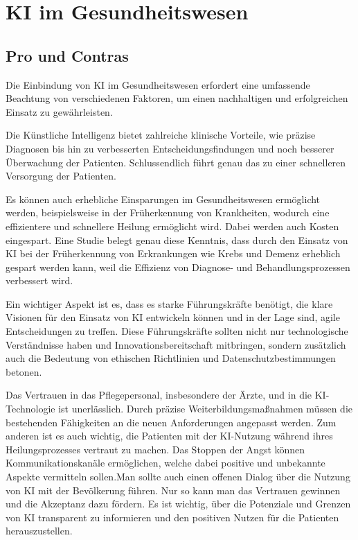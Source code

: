 
\chapter{KI im Gesundheitswesen}

\section {Pro und Contras}
Die Einbindung von KI im Gesundheitswesen erfordert eine umfassende Beachtung von verschiedenen Faktoren, um einen nachhaltigen und erfolgreichen Einsatz zu gewährleisten.

\vspace{1mm}Die Künstliche Intelligenz bietet zahlreiche klinische Vorteile, wie präzise Diagnosen bis hin zu verbesserten Entscheidungsfindungen und noch besserer Überwachung der Patienten. Schlussendlich führt genau das zu einer schnelleren Versorgung der Patienten.

\vspace{1mm}Es können auch erhebliche Einsparungen im Gesundheitswesen ermöglicht werden, beispielsweise in der Früherkennung von Krankheiten, wodurch eine effizientere und schnellere Heilung ermöglicht wird. Dabei werden auch Kosten eingespart. Eine Studie belegt genau diese Kenntnis, dass durch den Einsatz von KI bei der Früherkennung von Erkrankungen wie Krebs und Demenz erheblich gespart werden kann, weil die Effizienz von Diagnose- und Behandlungsprozessen verbessert wird.

\vspace{6mm}Ein wichtiger Aspekt ist es, dass es starke Führungskräfte benötigt, die klare Visionen für den Einsatz von KI entwickeln können und in der Lage sind, agile Entscheidungen zu treffen. Diese Führungskräfte sollten nicht nur technologische Verständnisse haben und Innovationsbereitschaft mitbringen, sondern zusätzlich auch die Bedeutung von ethischen Richtlinien und Datenschutzbestimmungen betonen.

\vspace{1mm}Das Vertrauen in das Pflegepersonal, insbesondere der Ärzte, und in die KI-Technologie ist unerlässlich. Durch präzise Weiterbildungsmaßnahmen müssen die bestehenden Fähigkeiten an die neuen Anforderungen angepasst werden. Zum anderen ist es auch wichtig, die Patienten mit der KI-Nutzung während ihres Heilungsprozesses vertraut zu machen. Das Stoppen der Angst können Kommunikationskanäle ermöglichen, welche dabei positive und unbekannte Aspekte vermitteln sollen.Man sollte auch einen offenen Dialog über die Nutzung von KI mit der Bevölkerung führen. Nur so kann man das Vertrauen gewinnen und die Akzeptanz dazu fördern. Es ist wichtig, über die Potenziale und Grenzen von KI transparent zu informieren und den positiven Nutzen für die Patienten herauszustellen.

